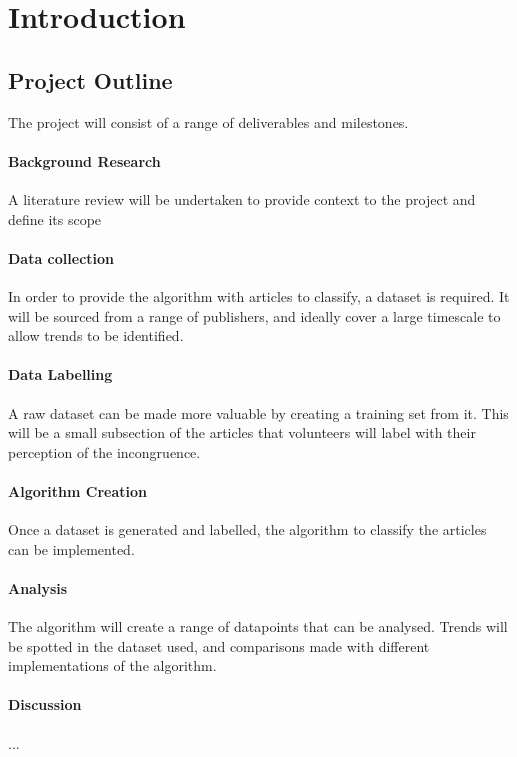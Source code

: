 \section{Introduction}

\subsection{Project Outline}
The project will consist of a range of deliverables and milestones.
 
\paragraph{Background Research}
A literature review will be undertaken to provide context to the project and define its scope

\paragraph{Data collection}
In order to provide the algorithm with articles to classify, a dataset is required. It will be sourced from a range of publishers, and ideally cover a large timescale to allow trends to be identified.

\paragraph{Data Labelling}
A raw dataset can be made more valuable by creating a training set from it. This will be a small subsection of the articles that volunteers will label with their perception of the incongruence.

\paragraph{Algorithm Creation}
Once a dataset is generated and labelled, the algorithm to classify the articles can be implemented. 

\paragraph{Analysis}
The algorithm will create a range of datapoints that can be analysed. Trends will be spotted in the dataset used, and comparisons made with different implementations of the algorithm.

\paragraph{Discussion}
...

